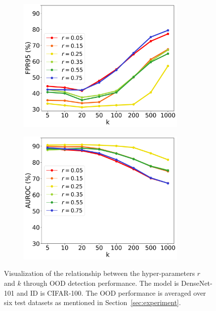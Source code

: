 \documentclass[letterpaper]{article} %
\theoremstyle{plain}
\theoremstyle{definition}
\theoremstyle{remark}
\begin{document}

\begin{figure}[h!]
\begin{subfigure}{0.5\textwidth}

  \includegraphics[width=0.90\textwidth]{images/ablations_NEW_FPR.png}
  \caption{}
  \label{fig:fpr}
\end{subfigure}%
\begin{subfigure}{0.5\textwidth}
  \includegraphics[width=0.90\textwidth]{images/ablations_NEW_AUROC.png}
  \caption{}
  \label{fig:auroc}
\end{subfigure}
\caption{\small Visualization of the relationship between the hyper-parameters $r$ and $k$ through OOD detection performance. The model is DenseNet-101 and ID is CIFAR-100. The OOD performance is averaged over six test datasets as mentioned in Section~\ref{sec:experiment}.}
\label{fig:relationship}
\end{figure}
\end{document}

